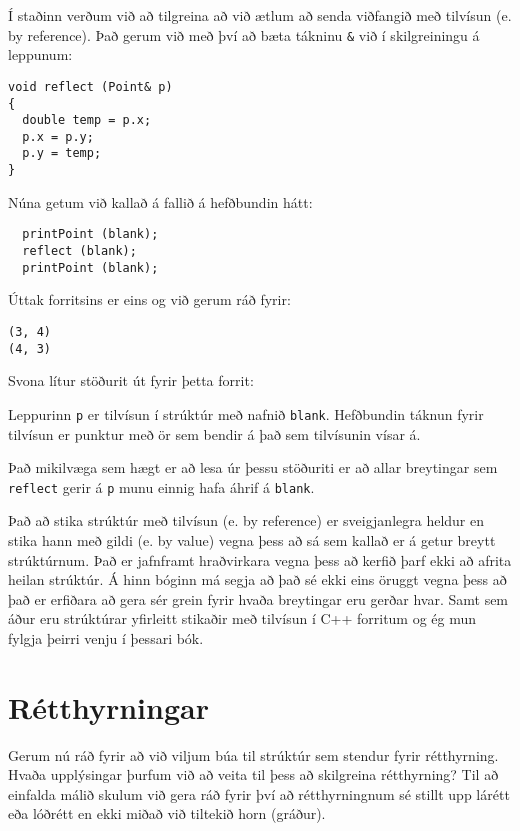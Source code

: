 Í staðinn verðum við að tilgreina að við ætlum að senda viðfangið með tilvísun (e. by reference).
Það gerum við með því að bæta tákninu {\tt \&} við í skilgreiningu á leppunum: 

\begin{verbatim}
void reflect (Point& p)
{
  double temp = p.x;
  p.x = p.y;
  p.y = temp;
}
\end{verbatim}
%
Núna getum við kallað á fallið á hefðbundin hátt:

\begin{verbatim}
  printPoint (blank);
  reflect (blank);
  printPoint (blank);
\end{verbatim}
%
Úttak forritsins er eins og við gerum ráð fyrir: 

\begin{verbatim}
(3, 4)
(4, 3)
\end{verbatim}
%
Svona lítur stöðurit út fyrir þetta forrit:

\vspace{0.1in}
\centerline{}
\vspace{0.1in}
%
Leppurinn {\tt p} er tilvísun í strúktúr með nafnið {\tt blank}.
Hefðbundin táknun fyrir tilvísun er punktur með ör sem bendir á það sem tilvísunin vísar á.

Það mikilvæga sem hægt er að lesa úr þessu stöðuriti er að allar breytingar sem 
{\tt reflect} gerir á {\tt p} munu einnig hafa áhrif á {\tt blank}.

Það að stika strúktúr með tilvísun (e. by reference) er sveigjanlegra heldur en stika hann með gildi (e. by value)
vegna þess að sá sem kallað er á getur breytt strúktúrnum.
Það er jafnframt hraðvirkara vegna þess að kerfið þarf ekki að afrita heilan strúktúr.
Á hinn bóginn má segja að það sé ekki eins öruggt vegna þess að það er erfiðara að gera sér grein fyrir hvaða breytingar eru gerðar hvar.
Samt sem áður eru strúktúrar yfirleitt stikaðir með tilvísun í C++ forritum og ég mun fylgja þeirri venju í þessari bók.

\section{Rétthyrningar}

Gerum nú ráð fyrir að við viljum búa til strúktúr sem stendur fyrir rétthyrning.
Hvaða upplýsingar þurfum við að veita til þess að skilgreina rétthyrning?
Til að einfalda málið skulum við gera ráð fyrir því að rétthyrningnum sé stillt upp lárétt eða lóðrétt en ekki miðað við tiltekið horn (gráður).


